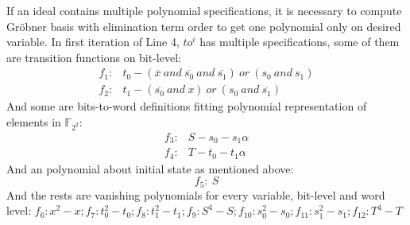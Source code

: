 If an ideal contains multiple polynomial specifications, it is necessary to compute Gr\"obner basis with elimination term
order to get one polynomial only on desired variable. In first iteration of Line 4, $to^i$ has multiple specifications,
some of them are transition functions on bit-level:
\begin{displaymath}
\begin{array}{ll}
f_1:& t_0 - (\overline{x}\ and\ \overline{s_0}\ and\ \overline{s_1})\ or\ (s_0\ and\ s_1) \\
f_2:& t_1 - (\overline{s_0}\ and\ x)\ or\ (s_0\ and\ \overline{s_1})\
\end{array}
\end{displaymath}
And some are bits-to-word definitions fitting polynomial representation of elements in $\mathbb{F}_{2^2}$:
\begin{displaymath}
\begin{array}{ll}
f_3:& S - s_0 - s_1\alpha \\
f_4:& T - t_0 - t_1\alpha
\end{array}
\end{displaymath}
And an polynomial about initial state as mentioned above:
\begin{displaymath}
f_5:\  S
\end{displaymath}
And the rests are vanishing polynomials for every variable, bit-level and word level:
$f_6: x^2 - x; f_7: t_0^2 - t_0; f_8: t_1^2 - t_1; f_9: S^4 - S; f_{10}: s_0^2 - s_0;
f_{11}: s_1^2 - s_1; f_{12}: T^4 - T$


